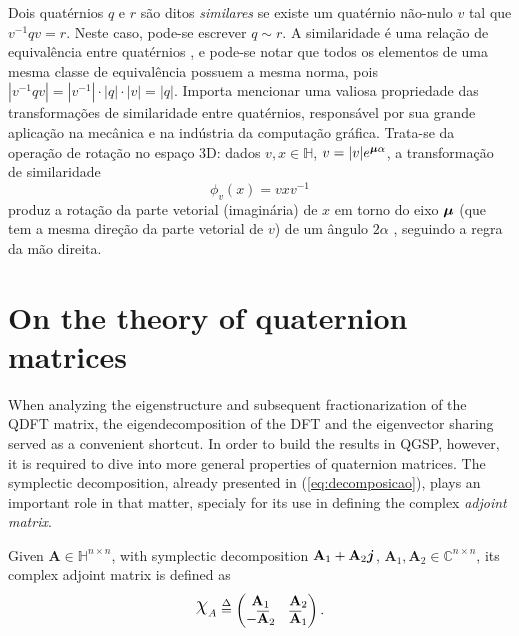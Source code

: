 Dois quat\'ernios $ q $ e $ r $ s\~ao ditos \emph{similares} se existe um quat\'ernio n\~ao-nulo $ v $ tal que $ v^{-1}q v = r $. Neste caso, pode-se escrever $ q \sim r $. A similaridade \'e uma rela\c c\~ao de equival\^encia entre quat\'ernios \cite{zhang1997quaternions}, e pode-se notar que todos os elementos de uma mesma classe de equival\^encia possuem a mesma norma, pois $ |v^{-1}q v| = |v^{-1}| \cdot |q| \cdot |v| = |q| $. Importa mencionar uma valiosa propriedade das transforma\c c\~oes de similaridade entre quat\'ernios, respons\'avel por sua grande aplica\c c\~ao na mec\^anica e na ind\'ustria da computa\c c\~ao gr\'afica. Trata-se da opera\c c\~ao de rota\c c\~ao no espa\c co 3D: dados $ v,x \in \mathbb{H} $, $ v = |v| e^{\boldsymbol{\mu} \alpha}$, a transforma\c c\~ao de similaridade
\begin{equation}
\label{eq:rotacao}
\phi_v(x) = v x v^{-1}
\end{equation}
produz a rota\c c\~ao da parte vetorial (imagin\'aria) de $ x $ em torno do eixo $ \boldsymbol{\mu} $ (que tem a mesma dire\c c\~ao da parte vetorial de $ v $) de um \^angulo $ 2\alpha $ \cite{ward2012quaternions}, seguindo a regra da m\~ao direita.


\section{On the theory of quaternion matrices}

When analyzing the eigenstructure and subsequent fractionarization of the QDFT matrix, the eigendecomposition of the DFT and the eigenvector sharing served as a convenient shortcut. In order to build the results in QGSP, however, it is required to dive into more general properties of quaternion matrices. The symplectic decomposition, already presented in (\ref{eq:decomposicao}), plays an important role in that matter, specialy for its use in defining the complex\textit{ adjoint matrix}.

\begin{definition}
Given $ \mathbf{A} \in \mathbb{H}^{n \times n} $, with symplectic decomposition $ \mathbf{A}_1 + \mathbf{A}_2 \boldsymbol{j}$, $ \mathbf{A}_1,\mathbf{A}_2 \in \mathbb{C}^{n \times n} $, its complex adjoint matrix is defined as
\begin{equation}
\rchi_{A} \overset{\Delta}{=}
\begin{pmatrix}
\mathbf{A}_1 & \mathbf{A}_2\\ 
- \overline{\mathbf{A}}_2 & \overline{\mathbf{A}}_1
\end{pmatrix}.
\end{equation}
\end{definition}

